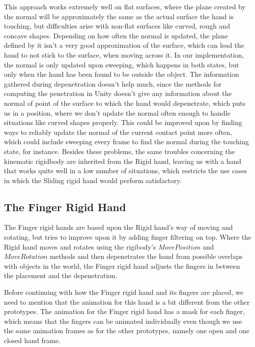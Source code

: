 This approach works extremely well on flat surfaces, where the plane created by the normal will be approximately the same as the actual surface the hand is touching, but difficulties arise with non-flat surfaces like curved, rough and concave shapes. Depending on how often the normal is updated, the plane defined by it isn't a very good approximation of the surface, which can lead the hand to not stick to the surface, when moving across it. In our implementation, the normal is only updated upon sweeping, which happens in both states, but only when the hand has been found to be outside the object. The information gathered during depenetration doesn't help much, since the methods for computing the penetration in Unity doesn't give any information about the normal of point of the surface to which the hand would depenetrate, which puts us in a position, where we don't update the normal often enough to handle situations like curved shapes properly. This could be improved upon by finding ways to reliably update the normal of the current contact point more often, which could include sweeping every frame to find the normal during the touching state, for instance. Besides these problems, the same troubles concerning the kinematic rigidbody are inherited from the Rigid hand, leaving us with a hand that works quite well in a low number of situations, which restricts the use cases in which the Sliding rigid hand would perform satisfactory.

\subsection{The Finger Rigid Hand}
\label{subsec:fingerRigidHand}
The Finger rigid hands are based upon the Rigid hand's way of moving and rotating, but tries to improve upon it by adding finger filtering on top. Where the Rigid hand moves and rotates using the rigibody's $MovePosition$ and $MoveRotation$ methods and then depenetrates the hand from possible overlaps with objects in the world, the Finger rigid hand adjusts the fingers in between the placement and the depenetration.

Before continuing with how the Finger rigid hand and its fingers are placed, we need to mention that the animation for this hand is a bit different from the other prototypes. The animation for the Finger rigid hand has a mask for each finger, which means that the fingers can be animated individually even though we use the same animation frames as for the other prototypes, namely one open and one closed hand frame.

